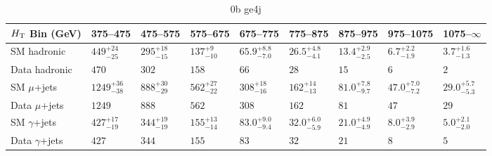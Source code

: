\documentclass[8pt]{article}
\def\scalht{\mbox{$H_{\rm{T}}$}\xspace}
\newcommand\T{\rule{0pt}{2.6ex}}
\newcommand\B{\rule[-1.2ex]{0pt}{0pt}}
\begin{document}
\begin{table}[ht!]
\caption{0b ge4j}
\label{tab:ensemble-0b ge4j}
\centering
\begin{tabular}{ lllllllll }

\hline
\scalht Bin (GeV)       & 375--475                       & 475--575                       & 575--675                       & 675--775                       & 775--875                       & 875--975                       & 975--1075                      & 1075--$\infty$                 \\ [1.000000ex]
\hline
SM hadronic\T           & $449^{+24}_{-25}$              & $295^{+18}_{-15}$              & $137^{+9}_{-10}$               & $65.9^{+8.8}_{-7.0}$           & $26.5^{+4.8}_{-4.1}$           & $13.4^{+2.9}_{-2.5}$           & $6.7^{+2.2}_{-1.9}$            & $3.7^{+1.6}_{-1.3}$            \\ 
Data hadronic\B         & $470$                          & $302$                          & $158$                          & $66$                           & $28$                           & $15$                           & $6$                            & $2$                            \\ 
\hline
SM $\mu$+jets\T         & $1249^{+36}_{-38}$             & $888^{+30}_{-29}$              & $562^{+27}_{-22}$              & $308^{+18}_{-16}$              & $162^{+14}_{-13}$              & $81.0^{+7.8}_{-9.7}$           & $47.0^{+7.0}_{-7.2}$           & $29.0^{+5.7}_{-5.3}$           \\ 
Data $\mu$+jets\B       & $1249$                         & $888$                          & $562$                          & $308$                          & $162$                          & $81$                           & $47$                           & $29$                           \\ 
\hline
SM $\gamma$+jets\T      & $427^{+17}_{-19}$              & $344^{+19}_{-19}$              & $155^{+13}_{-14}$              & $83.0^{+9.0}_{-9.4}$           & $32.0^{+6.0}_{-5.9}$           & $21.0^{+4.9}_{-4.9}$           & $8.0^{+3.9}_{-2.9}$            & $5.0^{+2.1}_{-2.0}$            \\ 
Data $\gamma$+jets\B    & $427$                          & $344$                          & $155$                          & $83$                           & $32$                           & $21$                           & $8$                            & $5$                            \\ 
\hline

\end{tabular}
\end{table}
\end{document}
